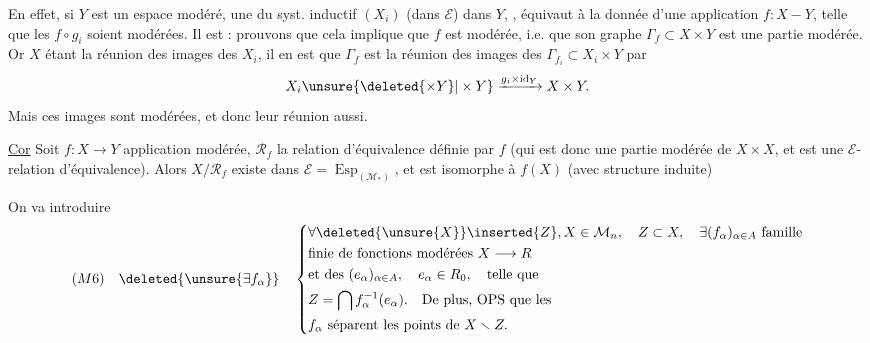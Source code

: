 En effet, si $Y$ est un espace modéré, une   du syst. inductif $(X_i)$ (dans $\mathcal E$) dans $Y$, , équivaut à la donnée d'une application $f:X\mathbin{-}Y$, telle que les $f\circ g_i$ soient modérées. Il est  : prouvons que cela implique que $f$ est modérée, i.e. que son graphe $\Gamma_f\subset X\times Y$ est une partie modérée. Or $X$ étant la réunion des images des $X_i$, il en est que $\Gamma_f$ est la réunion des images des $\Gamma_{f_i}\subset X_i\times Y$ par
\[
 X_i\unsure{\deleted{\times Y}|\times Y}\xrightarrow{g_i\times\operatorname{id}_Y}X\times Y.
\]
Mais ces images sont modérées, et donc leur réunion aussi.

\uline{Cor} Soit $f:X\longrightarrow Y$ application modérée, $\mathcal R_f$ la relation d'équivalence définie par $f$ (qui est donc une partie modérée de $X\times X$, et est une $\mathcal E$-relation d'équivalence). Alors $X/\mathcal R_f$ existe dans $\mathcal E=\operatorname{Esp}_{(\mathcal M_*)}$, et est  isomorphe à $f(X)$ (avec structure induite)


On va introduire
\[
(M6)\quad\deleted{\unsure{\exists f_\alpha}}\quad
\left\{\begin{aligned}
&\forall \deleted{\unsure{X}}\inserted{Z},X\in\mathcal M_n,\quad Z\subset X,\quad\exists(f_\alpha)_{\alpha\in A}\ \text{famille}\\
&\text{finie de fonctions modérées }X\longrightarrow R\\
&\text{et des }(e_\alpha)_{\alpha\in A},\quad e_\alpha\in R_0,\quad\text{telle que}\\
&Z=\bigcap f_\alpha^{-1}(e_\alpha).\quad\text{De plus, OPS que les}\\
&f_\alpha\text{ séparent les points de }X\smallsetminus Z.
\end{aligned}\right.
\]


